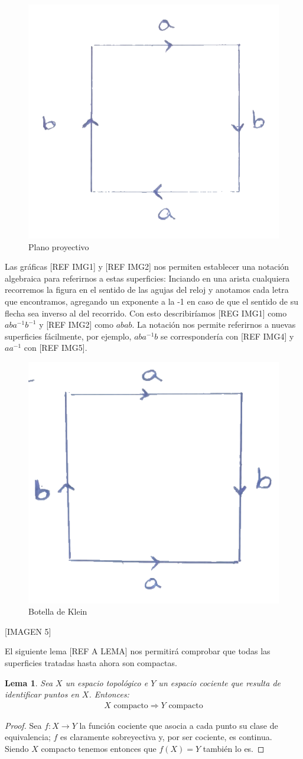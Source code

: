 \documentclass[a4paper,11pt,spanish, twoside, leqno]{tfg-uam}
\newtheorem{lema}[teor]{Lema}
\theoremstyle{definition}
\begin{document}
\begin{figure}[h]\label{fig:planoproyectivo}
	\centering
	\includegraphics[width=0.3\linewidth]{imagenes/planop.png}
	\caption{Plano proyectivo}
\end{figure} 

Las gráficas [REF IMG1] y [REF IMG2] nos permiten establecer una notación algebraica para referirnos a estas superficies: 
Inciando en una arista cualquiera recorremos la figura en el sentido de las agujas del reloj y anotamos cada letra que encontramos, agregando un exponente a la -1 en caso de que el sentido de su flecha sea inverso al del recorrido. Con esto describiríamos [REG IMG1] como $aba^{-1}b^{-1}$ y [REF IMG2] como $abab$. La notación nos permite referirnos a nuevas superficies fácilmente, por ejemplo, $aba^{-1}b$ se correspondería con [REF IMG4] y $aa^{-1}$ con [REF IMG5]. 


\begin{figure}[h]\label{fig:botelladeklein}
	\centering
	\includegraphics[width=0.3\linewidth]{imagenes/klein.png}
	\caption{Botella de Klein}
\end{figure} 


[IMAGEN 5]

El siguiente lema [REF A LEMA] nos permitirá comprobar que todas las superficies tratadas hasta ahora son compactas.

\begin{lema}
	Sea $X$ un espacio topológico e $Y$  un espacio cociente que resulta de identificar puntos en $X$. Entonces:
	\begin{align*}
	\text{$X$ compacto}\Rightarrow\text{$Y$ compacto}
	\end{align*}
\end{lema}
\begin{proof}
	Sea $f:X\longrightarrow Y$ la función cociente que asocia a cada punto su clase de equivalencia; $f$ es claramente sobreyectiva y, por ser cociente, es continua.\\
	Siendo $X$ compacto tenemos entonces que $f(X)=Y$ también lo es.
\end{proof}
\end{document}
